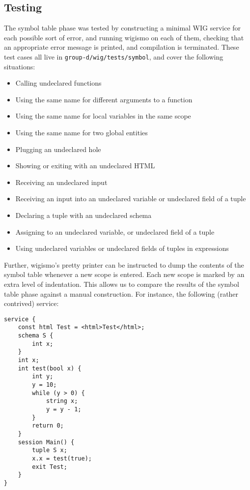 \documentclass{WigReport}
\begin{document}
\subsection{Testing}
The symbol table phase was tested by constructing a minimal WIG service
for each possible sort of error, and running wigismo on each of them,
checking that an appropriate error message is printed, and compilation is
terminated. These test cases all live in {\tt group-d/wig/tests/symbol},
and cover the following situations:

\begin{itemize}
\item Calling undeclared functions
\item Using the same name for different arguments to a function
\item Using the same name for local variables in the same scope
\item Using the same name for two global entities
\item Plugging an undeclared hole
\item Showing or exiting with an undeclared HTML
\item Receiving an undeclared input
\item Receiving an input into an undeclared variable or undeclared field 
of a tuple
\item Declaring a tuple with an undeclared schema
\item Assigning to an undeclared variable, or undeclared field of a tuple
\item Using undeclared variables or undeclared fields of tuples in
expressions
\end{itemize}

Further, wigismo's pretty printer can be instructed to dump the contents
of the symbol table whenever a new scope is entered. Each new scope is
marked by an extra level of indentation. This allows us to compare the
results of the symbol table phase against a manual construction. For
instance, the following (rather contrived) service:

\begin{verbatim}
service {
    const html Test = <html>Test</html>;
    schema S {
        int x;
    }
    int x;
    int test(bool x) {
        int y;
        y = 10;
        while (y > 0) {
            string x;
            y = y - 1;
        }
        return 0;
    }
    session Main() {
        tuple S x;
        x.x = test(true);
        exit Test;
    }
}
\end{verbatim}
\end{document}
